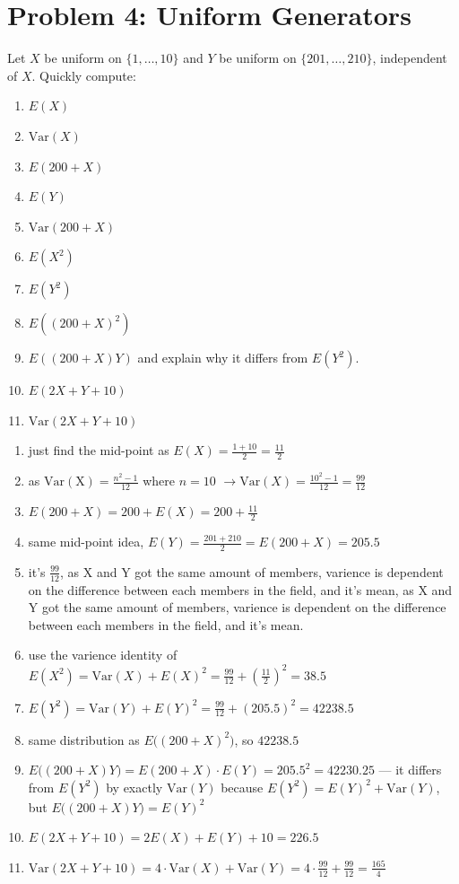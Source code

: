 \section*{Problem 4: Uniform Generators}
Let $X$ be uniform on $\{1,\dots,10\}$ and $Y$ be uniform on $\{201,\dots,210\}$, independent of $X$. Quickly compute:
\begin{enumerate}[label=\arabic*.]
    \item $E(X)$
    \item $\mathrm{Var}(X)$
    \item $E(200 + X)$
    \item $E(Y)$
    \item $\mathrm{Var}(200 + X)$
    \item $E(X^2)$
    \item $E(Y^2)$
    \item $E((200 + X)^2)$
    \item $E((200 + X)Y)$ and explain why it differs from $E(Y^2)$.
    \item $E(2X + Y + 10)$
    \item $\mathrm{Var}(2X + Y + 10)$
\end{enumerate}

\medskip
\solution

\begin{enumerate}
\item just find the mid-point as $E(X)=\frac{1+10}{2}=\boxed{\frac{11}{2}}$
\item as $\mathrm{Var(X)}=\frac{n^2-1}{12}$ where $n=10$ $\rightarrow \mathrm{Var}(X)=\frac{10^2-1}{12}=\boxed{\frac{99}{12}}$
\item $E(200+X)=200+E(X)=\boxed{200+\frac{11}{2}}$
\item same mid-point idea, $E(Y)=\frac{201+210}{2}=E(200+X)=\boxed{205.5}$
\item it's $\boxed{\frac{99}{12}}$, as X and Y got the same amount of members, varience is dependent on the difference between each members in the field, and it's mean, as X and Y got the same amount of members, varience is dependent on the difference between each members in the field, and it's mean.
\item use the varience identity of $E(X^2) = \mathrm{Var}(X)+E(X)^2=\frac{99}{12}+\left(\frac{11}{2}\right)^2=\boxed{38.5}$
\item $E(Y^2)=\mathrm{Var}(Y)+E(Y)^2 = \frac{99}{12} + (205.5)^2 = \boxed{42238.5}$
\item same distribution as $E\big((200+X)^2\big)$, so $\boxed{42238.5}$
\item $E\big((200+X)Y\big)=E(200+X) \cdot E(Y)=205.5^2=\boxed{42230.25}$ --- it differs from $E(Y^2)$ by exactly $\mathrm{Var}(Y)$ because $E(Y^2)=E(Y)^2+\mathrm{Var}(Y)$, but
$E\big((200+X)Y\big)=E(Y)^2$ 
\item $E(2X+Y+10)=2E(X)+E(Y)+10=\boxed{226.5}$
\item $\mathrm{Var}(2X+Y+10)=4 \cdot \mathrm{Var}(X)+\mathrm{Var}(Y)=4\cdot \tfrac{99}{12}+\tfrac{99}{12}=\boxed{\tfrac{165}{4}}$
\end{enumerate}
\vspace{1em}
\hrulefill

